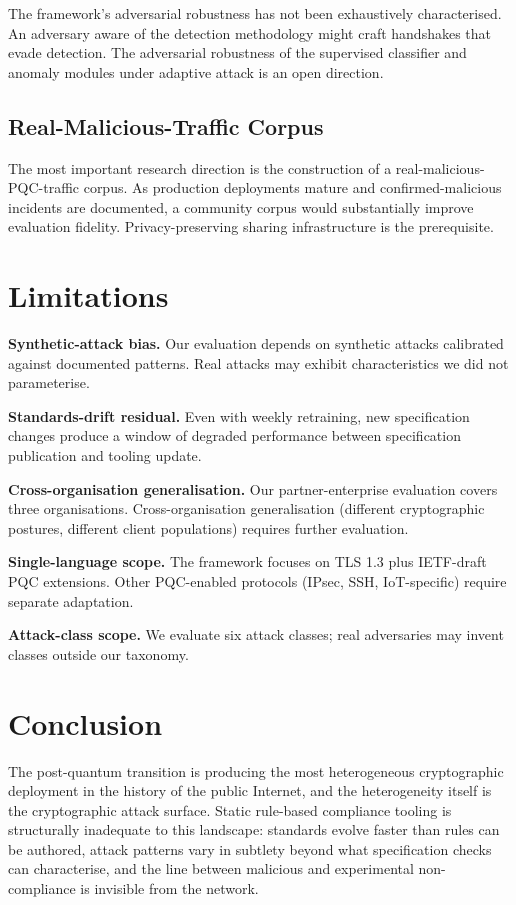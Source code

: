 \documentclass[sigconf,nonacm]{acmart}
\begin{document}
The framework's adversarial robustness has not been
exhaustively characterised. An adversary aware of the detection
methodology might craft handshakes that evade detection. The
adversarial robustness of the supervised classifier and anomaly
modules under adaptive attack is an open direction.

\subsection{Real-Malicious-Traffic Corpus}

The most important research direction is the construction of a
real-malicious-PQC-traffic corpus. As production deployments
mature and confirmed-malicious incidents are documented, a
community corpus would substantially improve evaluation
fidelity. Privacy-preserving sharing infrastructure is the
prerequisite.

\section{Limitations}

\textbf{Synthetic-attack bias.} Our evaluation depends on
synthetic attacks calibrated against documented patterns. Real
attacks may exhibit characteristics we did not parameterise.

\textbf{Standards-drift residual.} Even with weekly retraining,
new specification changes produce a window of degraded performance
between specification publication and tooling update.

\textbf{Cross-organisation generalisation.} Our partner-enterprise
evaluation covers three organisations. Cross-organisation
generalisation (different cryptographic postures, different
client populations) requires further evaluation.

\textbf{Single-language scope.} The framework focuses on TLS
1.3 plus IETF-draft PQC extensions. Other PQC-enabled
protocols (IPsec, SSH, IoT-specific) require separate
adaptation.

\textbf{Attack-class scope.} We evaluate six attack classes;
real adversaries may invent classes outside our taxonomy.

\section{Conclusion}

The post-quantum transition is producing the most heterogeneous
cryptographic deployment in the history of the public Internet,
and the heterogeneity itself is the cryptographic attack surface.
Static rule-based compliance tooling is structurally inadequate
to this landscape: standards evolve faster than rules can be
authored, attack patterns vary in subtlety beyond what specification
checks can characterise, and the line between malicious and
experimental non-compliance is invisible from the network.
\end{document}
